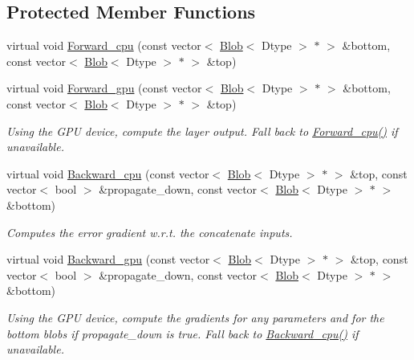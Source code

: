 \subsection*{Protected Member Functions}
\begin{DoxyCompactItemize}
\item 
virtual void \hyperlink{classcaffe_1_1ConcatLayer_a43e78b577df1365b5a727b607e337dee}{Forward\+\_\+cpu} (const vector$<$ \hyperlink{classcaffe_1_1Blob}{Blob}$<$ Dtype $>$ $\ast$ $>$ \&bottom, const vector$<$ \hyperlink{classcaffe_1_1Blob}{Blob}$<$ Dtype $>$ $\ast$ $>$ \&top)
\item 
virtual void \hyperlink{classcaffe_1_1ConcatLayer_a11543c884c0cc5855048721840bcb3ee}{Forward\+\_\+gpu} (const vector$<$ \hyperlink{classcaffe_1_1Blob}{Blob}$<$ Dtype $>$ $\ast$ $>$ \&bottom, const vector$<$ \hyperlink{classcaffe_1_1Blob}{Blob}$<$ Dtype $>$ $\ast$ $>$ \&top)\hypertarget{classcaffe_1_1ConcatLayer_a11543c884c0cc5855048721840bcb3ee}{}\label{classcaffe_1_1ConcatLayer_a11543c884c0cc5855048721840bcb3ee}

\begin{DoxyCompactList}\small\item\em Using the G\+PU device, compute the layer output. Fall back to \hyperlink{classcaffe_1_1ConcatLayer_a43e78b577df1365b5a727b607e337dee}{Forward\+\_\+cpu()} if unavailable. \end{DoxyCompactList}\item 
virtual void \hyperlink{classcaffe_1_1ConcatLayer_a6c0b0f9d58dfb41657762f02d7dcf466}{Backward\+\_\+cpu} (const vector$<$ \hyperlink{classcaffe_1_1Blob}{Blob}$<$ Dtype $>$ $\ast$ $>$ \&top, const vector$<$ bool $>$ \&propagate\+\_\+down, const vector$<$ \hyperlink{classcaffe_1_1Blob}{Blob}$<$ Dtype $>$ $\ast$ $>$ \&bottom)
\begin{DoxyCompactList}\small\item\em Computes the error gradient w.\+r.\+t. the concatenate inputs. \end{DoxyCompactList}\item 
virtual void \hyperlink{classcaffe_1_1ConcatLayer_aea23ac21d75f019d1db944e15524c548}{Backward\+\_\+gpu} (const vector$<$ \hyperlink{classcaffe_1_1Blob}{Blob}$<$ Dtype $>$ $\ast$ $>$ \&top, const vector$<$ bool $>$ \&propagate\+\_\+down, const vector$<$ \hyperlink{classcaffe_1_1Blob}{Blob}$<$ Dtype $>$ $\ast$ $>$ \&bottom)\hypertarget{classcaffe_1_1ConcatLayer_aea23ac21d75f019d1db944e15524c548}{}\label{classcaffe_1_1ConcatLayer_aea23ac21d75f019d1db944e15524c548}

\begin{DoxyCompactList}\small\item\em Using the G\+PU device, compute the gradients for any parameters and for the bottom blobs if propagate\+\_\+down is true. Fall back to \hyperlink{classcaffe_1_1ConcatLayer_a6c0b0f9d58dfb41657762f02d7dcf466}{Backward\+\_\+cpu()} if unavailable. \end{DoxyCompactList}\end{DoxyCompactItemize}
